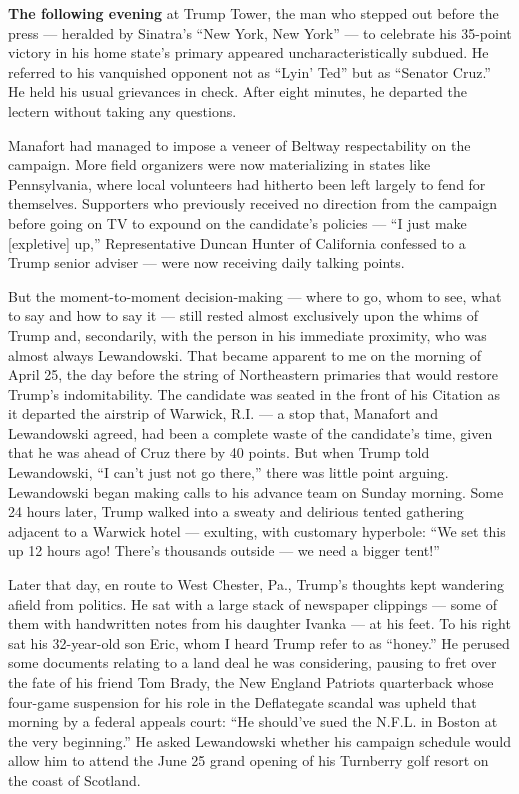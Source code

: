 \textbf{The following evening} at Trump Tower, the man who stepped out
before the press --- heralded by Sinatra's ``New York, New York'' --- to
celebrate his 35-point victory in his home state's primary appeared
uncharacteristically subdued. He referred to his vanquished opponent not
as ``Lyin' Ted'' but as ``Senator Cruz.'' He held his usual grievances
in check. After eight minutes, he departed the lectern without taking
any questions.

Manafort had managed to impose a veneer of Beltway respectability on the
campaign. More field organizers were now materializing in states like
Pennsylvania, where local volunteers had hitherto been left largely to
fend for themselves. Supporters who previously received no direction
from the campaign before going on TV to expound on the candidate's
policies --- ``I just make {[}expletive{]} up,'' Representative Duncan
Hunter of California confessed to a Trump senior adviser --- were now
receiving daily talking points.

But the moment-to-moment decision-making --- where to go, whom to see,
what to say and how to say it --- still rested almost exclusively upon
the whims of Trump and, secondarily, with the person in his immediate
proximity, who was almost always Lewandowski. That became apparent to me
on the morning of April 25, the day before the string of Northeastern
primaries that would restore Trump's indomitability. The candidate was
seated in the front of his Citation as it departed the airstrip of
Warwick, R.I. --- a stop that, Manafort and Lewandowski agreed, had been
a complete waste of the candidate's time, given that he was ahead of
Cruz there by 40 points. But when Trump told Lewandowski, ``I can't just
not go there,'' there was little point arguing. Lewandowski began making
calls to his advance team on Sunday morning. Some 24 hours later, Trump
walked into a sweaty and delirious tented gathering adjacent to a
Warwick hotel --- exulting, with customary hyperbole: ``We set this up
12 hours ago! There's thousands outside --- we need a bigger tent!''

Later that day, en route to West Chester, Pa., Trump's thoughts kept
wandering afield from politics. He sat with a large stack of newspaper
clippings --- some of them with handwritten notes from his daughter
Ivanka --- at his feet. To his right sat his 32-year-old son Eric, whom
I heard Trump refer to as ``honey.'' He perused some documents relating
to a land deal he was considering, pausing to fret over the fate of his
friend Tom Brady, the New England Patriots quarterback whose four-game
suspension for his role in the Deflategate scandal was upheld that
morning by a federal appeals court: ``He should've sued the N.F.L. in
Boston at the very beginning.'' He asked Lewandowski whether his
campaign schedule would allow him to attend the June 25 grand opening of
his Turnberry golf resort on the coast of Scotland.

